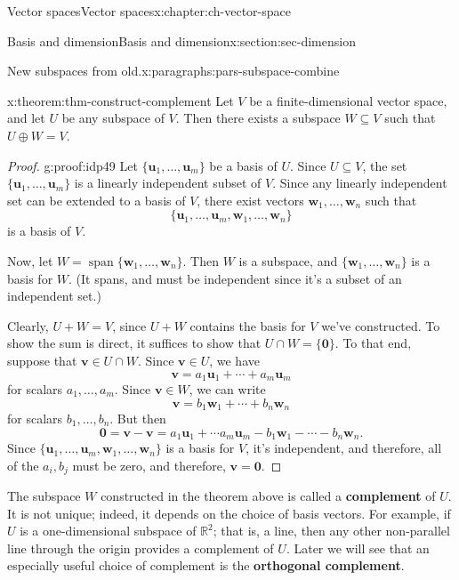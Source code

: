 \documentclass[oneside,10pt,]{book}
\newcommand{\terminology}[1]{\textbf{#1}}
\numberwithin{equation}{section}
\newcommand{\spn}{\operatorname{span}}
\newcommand{\R}{\mathbb{R}}
\newcommand{\uu}{\mathbf{u}}
\newcommand{\vv}{\mathbf{v}}
\newcommand{\ww}{\mathbf{w}}
\begin{document}
\begin{chapterptx}{Vector spaces}{}{Vector spaces}{}{}{x:chapter:ch-vector-space}
\begin{sectionptx}{Basis and dimension}{}{Basis and dimension}{}{}{x:section:sec-dimension}
\begin{paragraphs}{New subspaces from old.}{x:paragraphs:pars-subspace-combine}
\begin{theorem}{}{}{x:theorem:thm-construct-complement}%
Let \(V\) be a finite-dimensional vector space, and let \(U\) be any subspace of \(V\). Then there exists a subspace \(W\subseteq V\) such that \(U\oplus W = V\).%
\end{theorem}
\begin{proof}{}{g:proof:idp49}
Let \(\{\uu_1,\ldots, \uu_m\}\) be a basis of \(U\). Since \(U\subseteq V\), the set \(\{\uu_1,\ldots, \uu_m\}\) is a linearly independent subset of \(V\). Since any linearly independent set can be extended to a basis of \(V\), there exist vectors \(\ww_1,\ldots,\ww_n\) such that%
\begin{equation*}
\{\uu_1,\ldots, \uu_m,\ww_1,\ldots, \ww_n\}
\end{equation*}
is a basis of \(V\).%
\par
Now, let \(W = \spn\{\ww_1,\ldots, \ww_n\}\). Then \(W\) is a subspace, and \(\{\ww_1,\ldots, \ww_n\}\) is a basis for \(W\). (It spans, and must be independent since it's a subset of an independent set.)%
\par
Clearly, \(U+W=V\), since \(U+W\) contains the basis for \(V\) we've constructed. To show the sum is direct, it suffices to show that \(U\cap W = \{\mathbf{0}\}\). To that end, suppose that \(\vv\in U\cap W\). Since \(\vv\in U\), we have%
\begin{equation*}
\vv=a_1\uu_1+\cdots +a_m\uu_m
\end{equation*}
for scalars \(a_1,\ldots, a_m\). Since \(\vv\in W\), we can write%
\begin{equation*}
\vv=b_1\ww_1+\cdots + b_n\ww_n
\end{equation*}
for scalars \(b_1,\ldots, b_n\). But then%
\begin{equation*}
\mathbf{0}=\vv-\vv=a_1\uu_1+\cdots a_m\uu_m-b_1\ww_1-\cdots -b_n\ww_n.
\end{equation*}
Since \(\{\uu_1,\ldots, \uu_m,\ww_1,\ldots, \ww_n\}\) is a basis for \(V\), it's independent, and therefore, all of the \(a_i,b_j\) must be zero, and therefore, \(\vv=\mathbf{0}\).%
\end{proof}
The subspace \(W\) constructed in the theorem above is called a \terminology{complement} of \(U\). It is not unique; indeed, it depends on the choice of basis vectors. For example, if \(U\) is a one-dimensional subspace of \(\R^2\); that is, a line, then any other non-parallel line through the origin provides a complement of \(U\). Later we will see that an especially useful choice of complement is the \terminology{orthogonal complement}.%
\end{paragraphs}%
\end{sectionptx}
\end{chapterptx}
\end{document}
